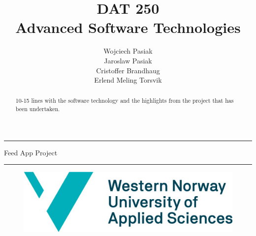 \documentclass[11pt]{article}
\begin{document}

\title{DAT 250\\Advanced Software Technologies}

\author{Wojciech Pasiak\\Jaroslaw Pasiak\\Cristoffer Brandhaug\\Erlend Meling Torsvik}

\maketitle
\noindent\rule{\textwidth}{1.6pt}\vspace*{\baselineskip}\vspace{2pt}
\vspace{0.75\baselineskip}
{\huge \centering
Feed App Project\\}
\vspace{0.75\baselineskip}
\noindent\rule{\textwidth}{1.6pt}\vspace*{-\baselineskip}\vspace{2pt}
\vspace{9pc}
\begin{figure}[H]
  \centering
  \includegraphics[scale=0.5]{figs/HVL_logo.jpg}
  \label{fig:logo}
\end{figure}
\newpage
{}
\tableofcontents
\newpage

\begin{abstract}

  10-15 lines with the software technology and the highlights from the
  project that has been undertaken.

\end{abstract}
\newpage

% 

% 

% 





% 

% 



\end{document}
